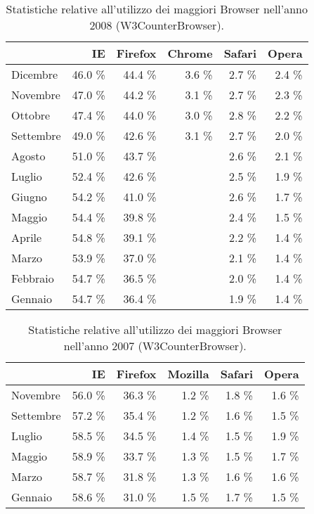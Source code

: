 \begin{table}
\begin{center}
\begin{tabular}{||p{4cm}|*{5}{r|}|}
	\hline
	\centering {\bfseries 2008}  & IE & Firefox & Chrome & Safari & Opera \\
	\hline
	\hline
	Dicembre & 46.0 \% & 44.4 \% & 3.6 \% & 2.7 \% & 2.4 \% \\
	\hline
	Novembre & 47.0 \% & 44.2 \% & 3.1 \% & 2.7 \% & 2.3 \% \\
	\hline
	Ottobre & 47.4 \% & 44.0 \% & 3.0 \% & 2.8 \% & 2.2 \% \\
	\hline
	Settembre & 49.0 \% & 42.6 \% & 3.1 \% & 2.7 \% & 2.0 \% \\
	\hline
	Agosto & 51.0 \% & 43.7 \% &   & 2.6 \% & 2.1 \% \\
	\hline
	Luglio & 52.4 \% & 42.6 \% &   & 2.5 \% & 1.9 \% \\
	\hline
	Giugno & 54.2 \% & 41.0 \% &   & 2.6 \% & 1.7 \% \\
	\hline
	Maggio & 54.4 \% & 39.8 \% &   & 2.4 \% & 1.5 \% \\
	\hline
	Aprile & 54.8 \% & 39.1 \% &   & 2.2 \% & 1.4 \% \\
	\hline
	Marzo & 53.9 \% & 37.0 \% &   & 2.1 \% & 1.4 \% \\
	\hline
	Febbraio & 54.7 \% & 36.5 \% &   & 2.0 \% & 1.4 \% \\
	\hline
	Gennaio & 54.7 \% & 36.4 \% &   & 1.9 \% & 1.4 \% \\
	\hline
\end{tabular}
 \caption{Statistiche relative all'utilizzo dei maggiori Browser nell'anno 2008 (W3CounterBrowser).}
 \label{tab:brow_stats_2008}
\end{center}
\end{table}

\begin{table}
\begin{center}
\begin{tabular}{||p{4cm}|*{5}{r|}|}
	\hline
	\centering {\bfseries 2007}  & IE & Firefox & Mozilla & Safari & Opera \\
	\hline
	\hline
	Novembre & 56.0 \% & 36.3 \% & 1.2 \% & 1.8 \% & 1.6 \% \\
	\hline
	Settembre & 57.2 \% & 35.4 \% & 1.2 \% & 1.6 \% & 1.5 \% \\
	\hline
	Luglio & 58.5 \% & 34.5 \% & 1.4 \% & 1.5 \% & 1.9 \% \\
	\hline
	Maggio & 58.9 \% & 33.7 \% & 1.3 \% & 1.5 \% & 1.7 \% \\
	\hline
	Marzo & 58.7 \% & 31.8 \% & 1.3 \% & 1.6 \% & 1.6 \% \\
	\hline
	Gennaio & 58.6 \% & 31.0 \% & 1.5 \% & 1.7 \% & 1.5 \% \\
	\hline
\end{tabular}
 \caption{Statistiche relative all'utilizzo dei maggiori Browser nell'anno 2007 (W3CounterBrowser).}
 \label{tab:brow_stats_2007}
\end{center}
\end{table}

